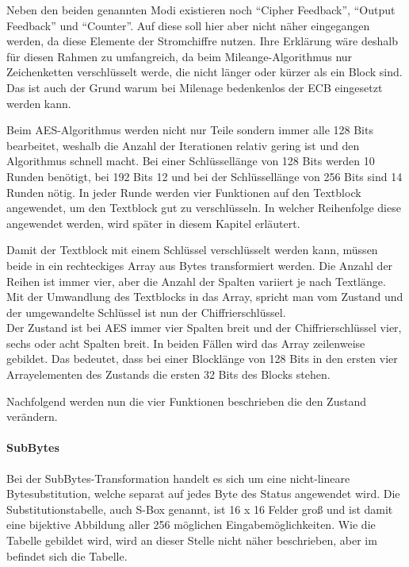   Neben den beiden genannten Modi existieren noch ``Cipher Feedback'', ``Output Feedback'' und
  ``Counter''. Auf diese soll hier aber nicht näher eingegangen werden, da diese Elemente der
  Stromchiffre nutzen. Ihre Erklärung wäre deshalb für diesen Rahmen zu umfangreich, da beim
  Mileange-Algorithmus nur Zeichenketten verschlüsselt werde, die nicht länger oder kürzer als ein Block
  sind. Das ist auch der Grund warum bei Milenage bedenkenlos der ECB eingesetzt werden kann.
  
  Beim AES-Algorithmus werden nicht nur Teile sondern immer alle 128 Bits bearbeitet, weshalb die
  Anzahl der Iterationen relativ gering ist und den Algorithmus schnell macht. Bei einer Schlüssellänge
  von 128 Bits werden 10 Runden benötigt, bei 192 Bits 12 und bei der Schlüssellänge von 256 Bits
  sind 14 Runden nötig. In jeder Runde werden vier Funktionen auf den Textblock angewendet, um
  den Textblock gut zu verschlüsseln. In welcher Reihenfolge diese angewendet werden, wird später
  in diesem Kapitel erläutert.
  
  Damit der Textblock mit einem Schlüssel verschlüsselt werden kann, müssen beide in ein rechteckiges
  Array aus Bytes transformiert werden. Die Anzahl der Reihen ist immer vier, aber die Anzahl der Spalten
  variiert je nach Textlänge. Mit der Umwandlung des Textblocks in das Array, spricht man vom Zustand
  und der umgewandelte Schlüssel ist nun der Chiffrierschlüssel. \\
  Der Zustand ist bei AES immer vier Spalten breit und der Chiffrierschlüssel vier, sechs oder acht Spalten
  breit. In beiden Fällen wird das Array zeilenweise gebildet. Das bedeutet, dass bei einer Blocklänge von
  128 Bits in den ersten vier Arrayelementen des Zustands die ersten 32 Bits des Blocks stehen.
  
  Nachfolgend werden nun die vier Funktionen beschrieben die den Zustand verändern.
  
  \paragraph{SubBytes}
   Bei der SubBytes-Transformation handelt es sich um eine nicht-lineare Bytesubstitution, welche
   separat auf jedes Byte des Status angewendet wird. Die Substitutionstabelle, auch S-Box genannt,
   ist 16 x 16 Felder groß und ist damit eine bijektive Abbildung aller 256 möglichen Eingabemöglichkeiten.
   Wie die Tabelle gebildet wird, wird an dieser Stelle nicht näher beschrieben, aber im 
   befindet sich die Tabelle.
   
